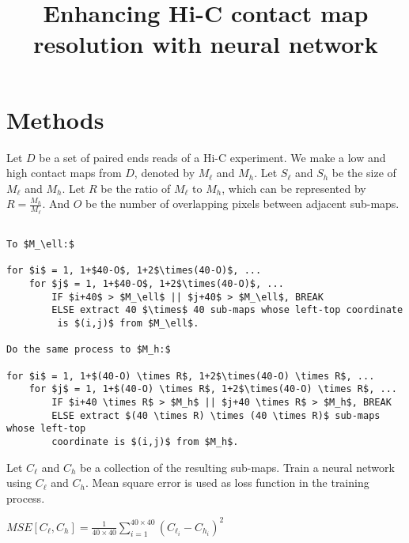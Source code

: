 \documentclass{article}
\begin{document}
\title{Enhancing Hi-C contact map resolution with neural network}
\author{}
\maketitle



\section{Methods}


Let $D$ be a set of paired ends reads of a Hi-C experiment. 
We make a low and high contact maps from $D$, denoted by $M_\ell$ and $M_h$. 
Let $S_\ell$ and $S_h$ be the size of $M_\ell$ and $M_h$. 
Let $R$ be the ratio of $M_\ell$ to $M_h$, which can be represented by
$R = \frac{M_h}{M_\ell}$. And $O$ be the number of overlapping pixels between adjacent sub-maps.

\begin{Verbatim}[commandchars=\\\{\},codes={\catcode`$=3\catcode`_=8\catcode`^=7}]
% Divide matrices $M_\ell$ and $M_h$ \

To $M_\ell:$

for $i$ = 1, 1+$40-O$, 1+2$\times(40-O)$, ...
    for $j$ = 1, 1+$40-O$, 1+2$\times(40-O)$, ...
        IF $i+40$ > $M_\ell$ || $j+40$ > $M_\ell$, BREAK 
        ELSE extract 40 $\times$ 40 sub-maps whose left-top coordinate
         is $(i,j)$ from $M_\ell$.

Do the same process to $M_h:$

for $i$ = 1, 1+$(40-O) \times R$, 1+2$\times(40-O) \times R$, ...
    for $j$ = 1, 1+$(40-O) \times R$, 1+2$\times(40-O) \times R$, ...
        IF $i+40 \times R$ > $M_h$ || $j+40 \times R$ > $M_h$, BREAK 
        ELSE extract $(40 \times R) \times (40 \times R)$ sub-maps whose left-top 
        coordinate is $(i,j)$ from $M_h$.
\end{Verbatim}



\noindent Let $C_\ell$ and $C_h$ be a collection of the resulting sub-maps. 
Train a neural network using $C_\ell$ and $C_h$. Mean square error is used as 
loss function in the training process. 

\begin{center}
    $MSE[C_\ell, C_h] = \frac{1}{40 \times 40} \sum_{i=1}^{40 \times 40} (C_{\ell_i}-C_{h_i})^2$
\end{center}
\end{document}
